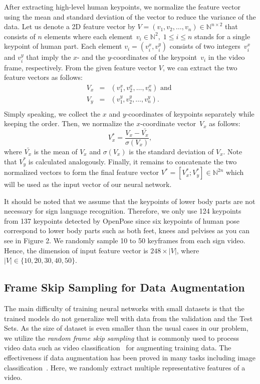 \documentclass[10pt,twocolumn,letterpaper]{article}
\begin{document}
After extracting high-level human keypoints, we normalize the feature vector using the mean and standard deviation of the vector to reduce the variance of the data. Let us denote a 2D feature vector by $V = (v_1, v_2, \ldots, v_n) \in \mathbb{N}^{n\times2}$ that consists of $n$ elements where each element~$v_i \in \mathbb{N}^2,\;1 \le i \le n$ stands for a single keypoint of human part. Each element $v_i = (v_i^x, v_i^y)$ consists of two integers~$v_i^x$ and $v_i^y$ that imply the $x$- and the $y$-coordinates of the keypoint~$v_i$ in the video frame, respectively. From the given feature vector $V$, we can extract the two feature vectors as follows:
\[
\begin{array}{lcl}
V_x & = & (v_1^x, v_2^x, \ldots, v_n^x)\textrm{ and } \\
V_y & = & (v_1^y, v_2^y, \ldots, v_n^y).\\
\end{array}
\]
Simply speaking, we collect the $x$ and $y$-coordinates of keypoints separately while keeping the order. Then, we normalize the $x$-coordinate vector~$V_x$ as follows:
\[
V_x^* = \frac{V_x - \bar{V_x}}{\sigma(V_x)},
\]
where $\bar{V_x}$ is the mean of $V_x$ and $\sigma(V_x)$ is the standard deviation of $V_x$. 
Note that $V_y^*$ is calculated analogously.
Finally, it remains to concatenate the two normalized vectors to form the 
final feature vector $V^* = [V_x^*; V_y^*] \in \mathbb{N}^{2n}$ which will 
be used as the input vector of our neural network.


It should be noted that we assume that the keypoints of lower body parts are not necessary for sign language recognition. Therefore, we only use 124 keypoints from 137 keypoints detected by OpenPose since six keypoints of human pose correspond to lower body parts such as both feet, knees and pelvises as you can see in Figure 2. We randomly sample 10 to 50 keyframes from each sign video. Hence, the dimension of input feature vector is $248 \times |V|$, where $|V| \in \{ 10, 20, 30, 40, 50\}$.

\subsection{Frame Skip Sampling for Data Augmentation}

The main difficulty of training neural networks with small datasets is that
the trained models do not generalize well with data from the validation and 
the Test Sets. As the size of dataset is even smaller than the usual cases 
in our problem, we utilize the {\em random frame skip sampling} that is commonly used to 
process video data such as video classification~\cite{KarpathyTSLSF14} for augmenting 
training data. The effectiveness if data augmentation has been proved in 
many tasks including image classification~\cite{PerezW17}. Here, we randomly extract multiple representative features of a video. 
\end{document}
